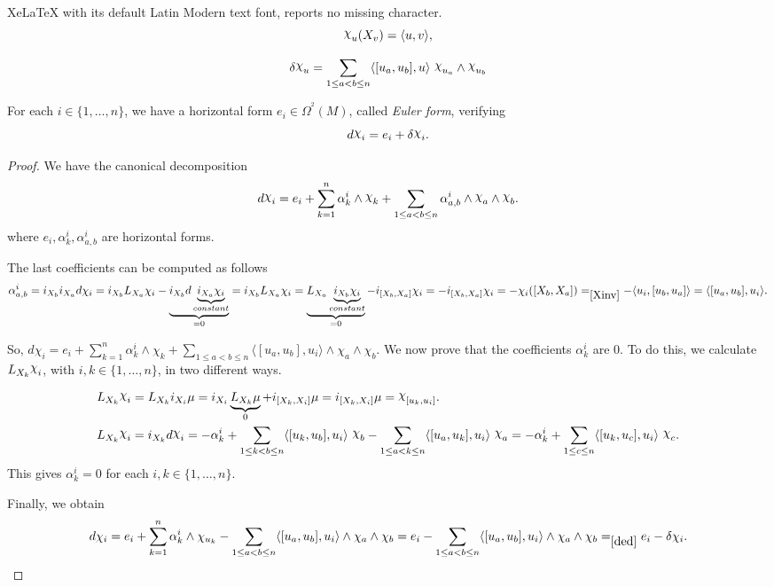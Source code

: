 \documentclass[10pt,a4paper]{amsart}
\newcommand\Om{\Omega}
\newcommand\chii{\raise2pt\hbox{$\chi$}}
\newcommand{\coho}[3]{{#1}^{^{#2}}{\left( #3 \right)}}
\begin{document}
XeLaTeX with its default Latin Modern text font, reports no missing character.
\begin{equation}\label{Xinv}
\chii_{u} (X_v) =  \langle u,v\rangle,
\end{equation}

  \begin{equation}\label{ded}
 \delta \chii_u =
 \sum_{1\leq a <b\leq n} \langle [u_a,u_b],u\rangle  \  \chii_{u_a} \wedge \chii_{u_b}
 \end{equation}

\begin{proposition}\label{ddelta}
For each  $i\in \{1,\ldots,n\}$,  we have a horizontal  form $e_i \in \coho  \Om 2  M$, called \emph{Euler form},  verifying
 \begin{equation}\label{bat}
d\chii_i =
e_i  + 
\delta \chii_i.
\end{equation}
\end{proposition}

\begin{proof}
We have the canonical decomposition 
$$
d\chii_{i} = e_i + \sum_{k=1}^n \alpha_k^i  \wedge \chii_{k} + \sum_{1\leq a <b\leq n} \alpha^i_{a,b} \wedge \chii_{a} \wedge \chii_{b}.
$$
where $e_i , \alpha_k^i ,  \alpha^i_{a,b} $ are horizontal forms.

The last coefficients  can be computed as follows
\begin{align*}
 \alpha^i_{a,b} =  i_{X_b}i_{X_a} d\chi_i  =  i_{X_b}L_{X_a}  \chi_i -  \underbrace{i_{X_b} d\underbrace{ i_{X_a} \chi_i }_{constant}}_{=0} 
 =  i_{X_b}L_{X_a}  \chi_i =  \underbrace{L_{X_a} \underbrace{ i_{X_b}  \chi_i}_{constant}}_{=0} -  i_{[X_b, X_a]}  \chi_i 
 =
 - i_{[X_b, X_a]}  \chi_i  = - \chi_i([X_b, X_a]) 
   =_{\eqref{Xinv}} - \langle u_i, [u_b,u_a]\rangle =  \langle[u_a,u_b],u_i\rangle.
 \end{align*} 
 
 So,
$
\displaystyle 
d\chi_i =
e_i+ \sum_{k=1}^n \alpha_k^i  \wedge\chi_{k} +
 \sum_{1\leq a <b\leq n}  \langle[u_a,u_b],u_i\rangle \wedge \chi_{a} \wedge \chi_{b}.
$
We  now prove  that the coefficients $\alpha_k^i$  are 0. To do this, we calculate $ L_{X_{k}} \chii_{i} $, with $i,k\in\{1, \ldots,n\}$,
 in two different ways.

\begin{align*}
L_{X_{k}} \chii_{i}&= L_{X_{k}} i_{X_{i}} \mu = i_{X_{i}}\underbrace{L_{X_{k}} \mu}_0   + i_{[X_{k},X_{i} ]} \mu 
 = i_{[X_{k},X_{i}]} \mu  = \chii_{[u_k,u_i]}. \\
L_{X_{k}} \chii_{i}&= i_{X_{k}} d\chii_i  =  -\alpha_k^i  +  \sum_{1\leq k <b\leq n} \langle[u_k,u_b],u_i\rangle\ \chii_{b} -   
 \sum_{1\leq a <k\leq n}  \langle[u_a,u_k],u_i\rangle\  \chii_{a} 
 =  - \alpha_k^i  +  \sum_{1\leq c\leq n} \langle[u_k,u_c],u_i\rangle  \ \chii_{c}.
\end{align*}
This gives $\alpha_k^i=0$ for each $i,k\in\{1, \ldots,n\}$.

 
Finally, we obtain
$$
d\chi_i = 
e_i+ \sum_{k=1}^n \alpha_k^i  \wedge \chi_{u_k} -
 \sum_{1\leq a <b\leq n}  \langle[u_a,u_b],u_i\rangle \wedge \chi_{a} \wedge \chi_{b}
 =
 e_i -
 \sum_{1\leq a <b\leq n}  \langle[u_a,u_b],u_i\rangle \wedge \chi_{a} \wedge \chi_{b}
=_{\eqref{ded}}
 e_i - \delta \chi_i. \qedhere
$$
 \end{proof}
\end{document}
